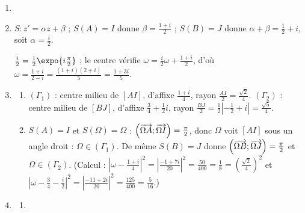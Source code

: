\begin{description}
	\begin{enumerate}
		\item {}
		\item {}
			$S : z' = \alpha z + \beta$ ; $S(A) = I$ donne $\beta = \frac{1+i}{2}$ ; $S(B) = J$ donne $\alpha + \beta = \frac{1}{2} + i$, soit $\alpha = \frac{i}{2}$.
			\par\noindent{}
			$\frac{i}{2} = \frac{1}{2}\expo{i\frac{\pi}{2}}$ ; le centre vérifie $\omega = \frac{i}{2}\omega + \frac{1+i}{2}$, d'où $\omega = \frac{1+i}{2 - i} = \frac{(1+i)(2+i)}{5} = \frac{1 + 3i}{5}$.
			\par\noindent{}
		\item
		\begin{enumerate}
			\item {}
				$(\Gamma_1)$ : centre milieu de $[AI]$, d'affixe $\frac{1+i}{4}$, rayon $\frac{AI}{2} = \frac{\sqrt{2}}{4}$.
				$(\Gamma_2)$ : centre milieu de $[BJ]$, d'affixe $\frac{3}{4} + \frac{1}{2}i$, rayon $\frac{BJ}{2} = \frac{1}{2}\left|-\frac{1}{2} + i\right| = \frac{\sqrt{5}}{4}$.
				\par\noindent{}
			\item {}
				$S(A) = I$ et $S(\Omega) = \Omega$ : $\left( \overrightarrow{\Omega A} ; \overrightarrow{\Omega I} \right) = \frac{\pi}{2}$, donc $\Omega$ voit $[AI]$ sous un angle droit : $\Omega \in (\Gamma_1)$.
				De même $S(B) = J$ donne $\left( \overrightarrow{\Omega B} ; \overrightarrow{\Omega J} \right) = \frac{\pi}{2}$ et $\Omega \in (\Gamma_2)$.
				(Calcul : $\left|\omega - \frac{1+i}{4}\right|^2 = \left|\frac{-1 + 7i}{20}\right|^2 = \frac{50}{400} = \frac{1}{8} = \left(\frac{\sqrt{2}}{4}\right)^2$ et
				$\left|\omega - \frac{3}{4} - \frac{i}{2}\right|^2 = \left|\frac{-11 + 2i}{20}\right|^2 = \frac{125}{400} = \frac{5}{16}$.)
				\par\noindent{}
		\end{enumerate}
		\item
		\begin{enumerate}
			\item {}

\end{enumerate}
\end{enumerate}
\end{description}
